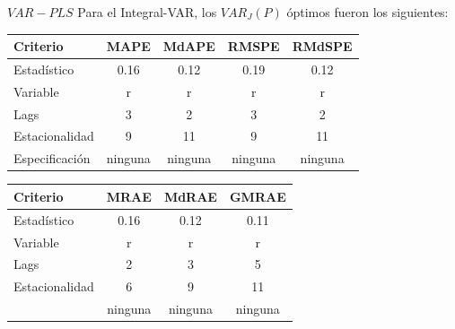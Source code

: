 \documentclass{beamer}
\newcommand{\?}{?`}
\begin{document}
\begin{frame}{$VAR-PLS$}
  Para el Integral-VAR, los $VAR_J(P)$ \'optimos fueron los
  siguientes:
  \medskip

  \begin{footnotesize}
  \begin{tabular}{|l|c|c|c|c|}
    \hline
    Criterio & MAPE & MdAPE & RMSPE & RMdSPE \\
    \hline
    Estad\'istico & 0.16 & 0.12 & 0.19 & 0.12 \\
    Variable & r & r & r & r \\
    Lags & 3 & 2 & 3 & 2 \\
    Estacionalidad & 9 & 11 & 9 & 11 \\
    Especificaci\'on & ninguna & ninguna & ninguna& ninguna \\
    \hline
  \end{tabular}
  \end{footnotesize}

  \begin{footnotesize}
  \begin{tabular}{|l|c|c|c|}
    \hline
    Criterio & MRAE & MdRAE & GMRAE \\
    \hline
    Estad\'istico & 0.16 & 0.12 & 0.11 \\
    Variable & r & r & r \\
    Lags & 2 & 3 & 5 \\
    Estacionalidad & 6 & 9 & 11 \\
    & ninguna& ninguna& ninguna \\
    \hline
  \end{tabular}
  \end{footnotesize}
  \medskip
\end{frame}
\end{document}
